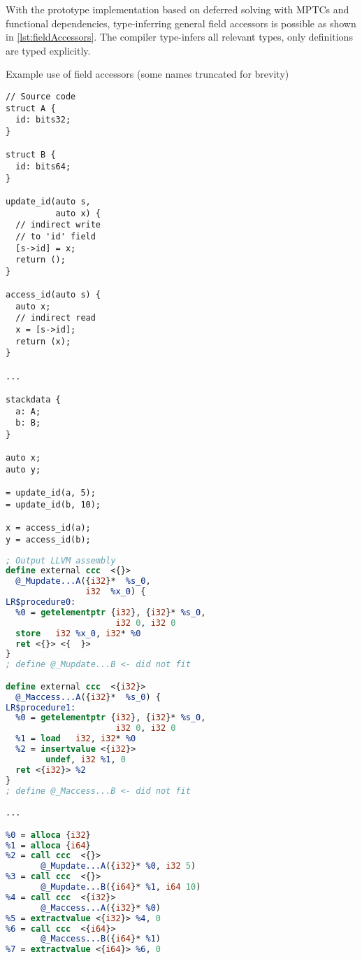 With the prototype implementation based on deferred solving with MPTCs and functional dependencies, type-inferring general field accessors is possible as shown in \cref{lst:fieldAccessors}. The compiler type-infers all relevant types, only  definitions are typed explicitly.

\begin{listing}
    \caption{Example use of field accessors (some names truncated for brevity)}
    \label{lst:fieldAccessors}
    \begin{center}
    \begin{minipage}{0.45\linewidth}
    \begin{lstlisting}[basicstyle=\footnotesize\ttfamily]
// Source code
struct A {
  id: bits32;
}

struct B {
  id: bits64;
}

update_id(auto s,
          auto x) {
  // indirect write
  // to 'id' field
  [s->id] = x;
  return ();
}

access_id(auto s) {
  auto x;
  // indirect read
  x = [s->id];
  return (x);
}

...

stackdata {
  a: A;
  b: B;
}

auto x;
auto y;

= update_id(a, 5);
= update_id(b, 10);

x = access_id(a);
y = access_id(b);
    \end{lstlisting}
    \end{minipage}%
    \begin{minipage}{0.55\linewidth}
    \begin{lstlisting}[language=LLVM,basicstyle=\scriptsize\ttfamily]
; Output LLVM assembly
define external ccc  <{}>
  @_Mupdate...A({i32}*  %s_0,
                i32  %x_0) {
LR$procedure0:
  %0 = getelementptr {i32}, {i32}* %s_0,
                      i32 0, i32 0
  store   i32 %x_0, i32* %0
  ret <{}> <{  }>
}
; define @_Mupdate...B <- did not fit

define external ccc  <{i32}>
  @_Maccess...A({i32}*  %s_0) {
LR$procedure1:
  %0 = getelementptr {i32}, {i32}* %s_0,
                      i32 0, i32 0
  %1 = load   i32, i32* %0
  %2 = insertvalue <{i32}>
        undef, i32 %1, 0
  ret <{i32}> %2
}
; define @_Maccess...B <- did not fit

...

%0 = alloca {i32}
%1 = alloca {i64}
%2 = call ccc  <{}>
       @_Mupdate...A({i32}* %0, i32 5)
%3 = call ccc  <{}>
       @_Mupdate...B({i64}* %1, i64 10)
%4 = call ccc  <{i32}>
       @_Maccess...A({i32}* %0)
%5 = extractvalue <{i32}> %4, 0
%6 = call ccc  <{i64}>
       @_Maccess...B({i64}* %1)
%7 = extractvalue <{i64}> %6, 0

    \end{lstlisting}
    \end{minipage}
    \end{center}
\end{listing}

